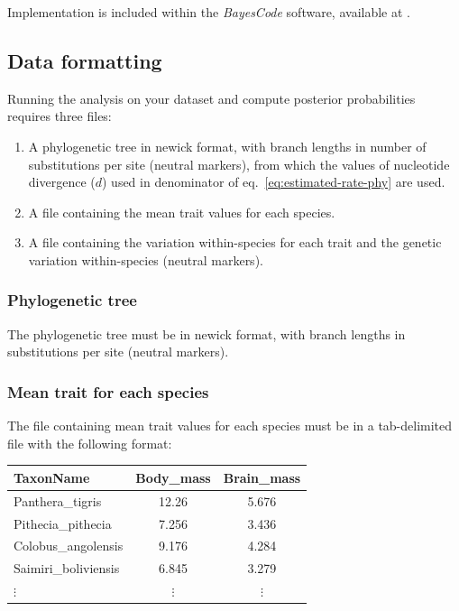 \documentclass{article}
\begin{document}
Implementation is included within the \textit{BayesCode} software, available at .

\subsection{Data formatting}\label{subsec:data-formatting}

Running the analysis on your dataset and compute posterior probabilities requires three files:
\begin{enumerate}
    \item A phylogenetic tree in newick format, with branch lengths in number of substitutions per site (neutral markers), from which the values of nucleotide divergence ($d$) used in denominator of eq.~\ref{eq:estimated-rate-phy} are used.
    \item A file containing the mean trait values for each species.
    \item A file containing the variation within-species for each trait and the genetic variation within-species (neutral markers).
\end{enumerate}

\subsubsection{Phylogenetic tree}

The phylogenetic tree must be in newick format, with branch lengths in substitutions per site (neutral markers).

\subsubsection{Mean trait for each species}

The file containing mean trait values for each species must be in a tab-delimited file with the following format:
\begin{center}
    \begin{adjustbox}{width = 0.35\textwidth}
        \begin{tabular}{|l|c|c|}
            \hline
            TaxonName            & Body\_mass & Brain\_mass \\
            \hline
            Panthera\_tigris     & 12.26      & 5.676       \\
            Pithecia\_pithecia   & 7.256      & 3.436       \\
            Colobus\_angolensis  & 9.176      & 4.284       \\
            Saimiri\_boliviensis & 6.845      & 3.279       \\
            $\vdots$             & $\vdots$   & $\vdots$    \\
            \hline
        \end{tabular}\label{tab:trait-mean}
    \end{adjustbox}
\end{center}
\end{document}
